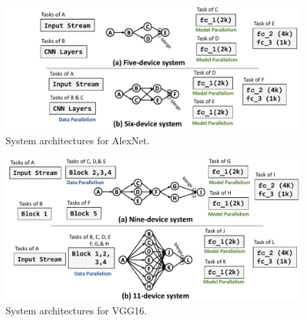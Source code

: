\documentclass[sigplan]{acmart}
\begin{document}
%
%
\begin{figure}[h]
\centering
\vspace{-10pt}
\includegraphics[width=1.0\linewidth]{figures/alexnet-nodes.pdf}
\captionsetup{singlelinecheck=on,aboveskip=0pt, belowskip=0pt}
\caption{System architectures for AlexNet.}
\label{fig:alexnet-system}
\vspace{-10pt}
\end{figure}
%
%
\begin{figure}[h]
\centering
\vspace{-5pt}
\includegraphics[width=1.0\linewidth]{figures/vgg-8nodes.pdf}
\captionsetup{singlelinecheck=on,aboveskip=5pt, belowskip=0pt}
\caption{System architectures for VGG16.}
\label{fig:vgg16-system}
\vspace{-15pt}
\end{figure}
%
%


\end{document}
